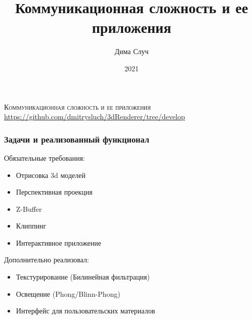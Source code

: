 \documentclass{beamer}
\title{Коммуникационная сложность и ее приложения}
\date{2021}
\author{Дима Случ}
\begin{document}
\begin{frame}
\begin{center}


{\large \scshape
Коммуникационная сложность и ее приложения
}
\url{https://github.com/dmitrysluch/3dRenderer/tree/develop}
\end{center}

\end{frame}
\begin{frame}
\frametitle{Задачи и реализованный функционал}
Обязательные требования:
\begin{itemize}
\item Отрисовка 3d моделей
\item Перспективная проекция
\item Z-Buffer
\item Клиппинг
\item Интерактивное приложение
\end{itemize}
\pause
Дополнительно реализовал:
\begin{itemize}
\item Текстурирование (Билинейная фильтрация)
\item Освещение (Phong/Blinn-Phong)
\item Интерфейс для пользовательских материалов
\end{itemize}
\end{frame}
\end{document}
